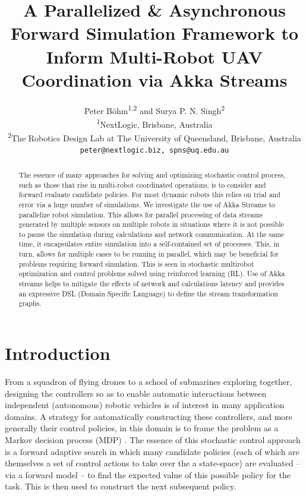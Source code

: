 \documentclass{article}
\title{A Parallelized \& Asynchronous Forward Simulation Framework to Inform Multi-Robot UAV Coordination via Akka Streams}
\author{Peter Böhm\textsuperscript{1,2} and Surya P. N. Singh\textsuperscript{2}
\\ \textsuperscript{1}NextLogic, Brisbane, Australia
\\ \textsuperscript{2}The Robotics Design Lab at The University of Queensland, Brisbane, Australia
\\ {\texttt{peter@nextlogic.biz, spns@uq.edu.au}}}
\let\cite\citep
\begin{document}
\maketitle

\begin{abstract}
The essence of many approaches for solving and optimizing stochastic control process, such as those that rise in multi-robot coordinated operations, is to consider and forward evaluate candidate policies.  For most dynamic robots this relies on trial and error via a huge number of simulations.  We investigate the use of Akka Streams to parallelize robot simulation. This allows for parallel processing of data streams generated by multiple sensors on multiple robots in situations where it is not possible to pause the simulation during calculations and network communication. At the same time, it encapsulates entire simulation into a self-contained set of processes. This, in turn, allows for multiple cases to be running in parallel, which may be beneficial for problems requiring forward simulation. This is seen in stochastic multirobot optimization and control problems solved using reinforced learning (RL). Use of Akka streams helps to mitigate the effects of network and calculations latency and provides an expressive DSL (Domain Specific Language) to define the stream transformation graphs. 
\end{abstract}


\section{Introduction}

From a squadron of flying drones to a school of submarines exploring together, designing the controllers so as to enable automatic interactions between independent (autonomous) robotic vehicles is of interest in many application domains.  A strategy for automatically constructing these controllers, and more generally their control policies, in this domain is to frame the problem as a Markov decision process (MDP) \cite{howard1960dynamic}.  The essence of this stochastic control approach is a forward adaptive search in which many candidate {policies} (each of which are themselves a set of control actions to take over the a state-space) are evaluated -- via a forward model -- to find the expected value of this possible policy for the task.  This is then used to construct the next subsequent policy.  
\end{document}
